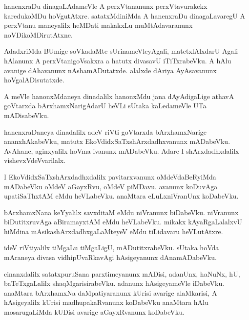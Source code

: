 \documentclass{article}
\begin{document}
\begin{mn}
hanenxraDu dinagaLAdameVle A perxVtananunx perxVtavurakekx karedukoMDu
hoVgutAtxre. satatxMdiniMda A hanenxraDu dinagaLavaregU A perxVtanu
maneyalilx heMDati makakxLu muMtAdavaranunx noVDikoMDirutAtxne.
\end{mn}

\begin{mn}
AdadxriMda BUmige soVkadaMte sUrinameVleyAgali, matetxlAlxdarU Agali
hAlanunx A perxVtanigoVsakxra a hatutx divasavU iTiTxrabeVku. A hAlu
avanige dAhavanunx nAshamADutatxde. alalxde dAriya AyAsavanunx hoVgalADisutatxde.
\end{mn}

\begin{mn}
A meVle hanonxMdaneya dinadalilx hanonxMdu jana dAyAdigaLige athavA
goVtarxda bArxhamxNarigAdarU heVLi sUtaka kaLedameVle UTa mADisabeVku.
\end{mn}

\begin{mn}
hanenxraDaneya dinadalilx adeV riVti goVtarxda bArxhamxNarige
ananxhAkabeVku, matutx EkoVdidxSaTxshArxdadhxvanunx
mADabeVku. AvAhane, aginxyalilx  hoVma ivanunx mADabeVku. Adare I
shArxdadhxdalilx vishevxVdeVvarilalx.
\end{mn}

\begin{mn}
I EkoVdidxSaTxshArxdadhxdalilx pavitarxvanunx oMdeVdaBeRyiMda
mADabeVku oMdeV aGayxRvu, oMdeV piMDavu. avanunx koDuvAga
upatiSaThxtAM eMdu heVLabeVku. anaMtara eLuLxniVranUnx koDabeVku.
\end{mn}

\begin{mn}
bArxhamxNana keYyalilx savxditaM eMdu niVranunx biDabeVku. niVranunx
biDutitxruvAga aBiramayxtAM eMdu heVLabeVku. mikakx kAyaRgaLalalxvU
hiMdina mAsikashArxdadhxgaLaMteyeV eMdu tiLidavaru heVLutAtxre.
\end{mn}

\begin{mn}
ideV riVtiyalilx tiMgaLu tiMgaLigU, mADutitxrabeVku. sUtaka hoVda
mAraneya divasa vidhipUvaRkavAgi hAsigeyanunx dAnamADabeVku.
\end{mn}

\begin{mn}
cinanxdalilx satatxpuruSana parxtimeyanunx mADisi, adanUnx, haNuNx,
hU, baTeTxgaLalilx shaqMgarisirabeVku. adanunx hAsigeyameVle
iDabeVku. anaMtara bArxhamxNa daMpatiyaranunx kUrisi avarige
alaMkarisi, A hAsigeyalilx kUrisi madhupakaRvanunx koDabeVku anaMtara
hAlu mosarugaLiMda kUDisi avarige aGayxRvanunx koDabeVku.
\end{mn}
\end{document}
